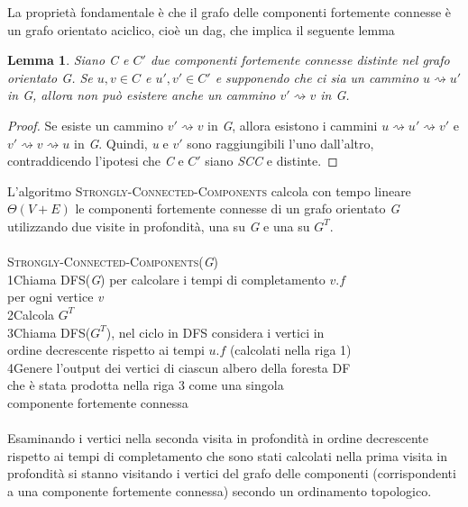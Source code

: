 \documentclass[10pt, a4paper]{report}
\newtheorem{lemma}{Lemma}[chapter]
\newcommand\firsttab[1][0.5cm]{\hspace*{#1}}
\newcommand\secondtab[1][1cm]{\hspace*{#1}}
\begin{document}
La proprietà fondamentale è che il grafo delle componenti fortemente connesse è un grafo orientato aciclico, cioè un dag, che implica il seguente lemma
\begin{lemma}
Siano \textit{C} e $C'$ due componenti fortemente connesse distinte nel grafo orientato \textit{G}. Se $u,v \in C$ e $u',v' \in C'$ e supponendo che ci sia un cammino $u \rightsquigarrow u'$ in \textit{G}, allora non può esistere anche un cammino $v' \rightsquigarrow v$ in \textit{G}.
\end{lemma}
\begin{proof}
Se esiste un cammino $v' \rightsquigarrow v$ in \textit{G}, allora esistono i cammini $u \rightsquigarrow u' \rightsquigarrow  v'$ e $v' \rightsquigarrow v \rightsquigarrow  u$ in \textit{G}. Quindi, \textit{u} e $v'$ sono raggiungibili l'uno dall'altro, contraddicendo l'ipotesi che \textit{C} e $C'$ siano \textit{SCC} e distinte.
\end{proof}
L'algoritmo \textsc{Strongly-Connected-Components} calcola con tempo lineare $\Theta(V + E)$ le componenti fortemente connesse di un grafo orientato \textit{G} utilizzando due visite in profondità, una su \textit{G} e una su $G^T$.\\\\
\textsc{Strongly-Connected-Components(\textit{G})}\\
1\firsttab Chiama \textsc{DFS(\textit{G})} per calcolare i tempi di completamento $v.f$\\
\secondtab per ogni vertice \textit{v}\\
2\firsttab Calcola $G^T$\\
3\firsttab Chiama \textsc{DFS($G^T$)}, nel ciclo in \textsc{DFS} considera i vertici in\\
\secondtab ordine decrescente rispetto ai tempi $u.f$ (calcolati nella riga 1)\\
4\firsttab Genere l'output dei vertici di ciascun albero della foresta DF\\
\secondtab che è stata prodotta nella riga 3 come una singola\\
\secondtab componente fortemente connessa\\\\
Esaminando i vertici nella seconda visita in profondità in ordine decrescente rispetto ai tempi di completamento che sono stati calcolati nella prima visita in profondità si stanno visitando i vertici del grafo delle componenti (corrispondenti a una componente fortemente connessa) secondo un ordinamento topologico.
\end{document}
